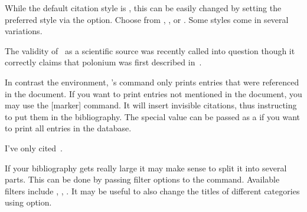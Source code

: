 While the default citation style is , this can be easily changed by
setting the preferred style via the  option. Choose from
,
,  or . Some styles come in
several variations.
\begin{example}[standalone,
  biber,
  paperwidth=6.5cm,
  paperheight=7.2cm,
]
\usepackage[
  style=alphabetic
]{biblatex}



\sloppy


\setlength{\parindent}{0pt} %
The validity of~\cite{dream}
as a scientific source was
recently called into question
though it correctly claims
that polonium was first
described in~\cite{curie}.
\printbibliography

\end{example}

In contrast the  environment, 's
 command only prints entries that were referenced in the
document. If you want to print entries not mentioned in the document, you may
use the [marker] command. It will insert invisible citations, thus
instructing  to put them in the bibliography. The special value
\cargv{*} can be passed as a  if you want to print all entries in
the database.
\begin{example}[standalone,
  biber,
  paperwidth=7cm,
  paperheight=7cm,
]
\usepackage{biblatex}


\setlength{\parindent}{0pt}
I've only
cited~\cite{lshort}.

\nocite{*}
\printbibliography

\end{example}

If your bibliography gets really large it may make sense to split it into
several parts. This can be done by passing filter options to the
 command. Available filters include ,
, . It may be useful to also change the titles of
different categories using  option.

\begin{example}[standalone,
  biber,
  paperwidth=6.5cm,
  paperheight=6.5cm,
]
\usepackage{biblatex}


\setlength{\parindent}{0pt}
\nocite{*}
\printbibliography[
  type=book,
  title=Books I've referenced
]

\printbibliography[
  keyword=unreliable,
  title=Don't trust those
]

\end{example}

